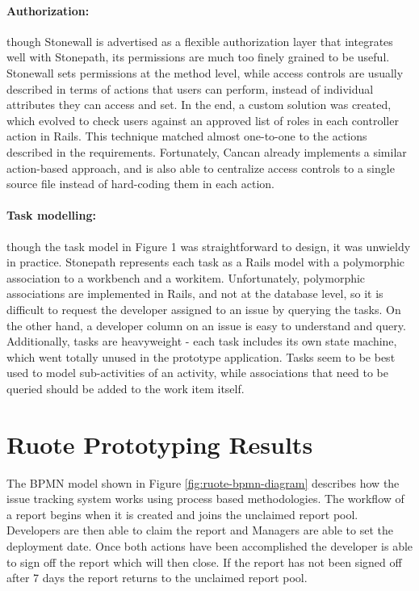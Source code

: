 \documentclass[document.tex]{subfiles}
\begin{document}
\paragraph{Authorization:} though Stonewall is advertised as a flexible authorization layer that integrates well with Stonepath, its permissions are much too finely grained to be useful. Stonewall sets permissions at the method level, while access controls are usually described in terms of actions that users can perform, instead of individual attributes they can access and set. In the end, a custom solution was created, which evolved to check users against an approved list of roles in each controller action in Rails. This technique matched almost one-to-one to the actions described in the requirements. Fortunately, Cancan already implements a similar action-based approach, and is also able to centralize access controls to a single source file instead of hard-coding them in each action.

\paragraph{Task modelling:} though the task model in Figure 1 was straightforward to design, it was unwieldy in practice. Stonepath represents each task as a Rails model with a polymorphic association to a workbench and a workitem. Unfortunately, polymorphic associations are implemented in Rails, and not at the database level, so it is difficult to request the developer assigned to an issue by querying the tasks. On the other hand, a developer column on an issue is easy to understand and query. Additionally, tasks are heavyweight - each task includes its own state machine, which went totally unused in the prototype application. Tasks seem to be best used to model sub-activities of an activity, while associations that need to be queried should be added to the work item itself.


\FloatBarrier

\section {Ruote Prototyping Results}
\label {sec:ruote-prototyping-results}

The BPMN model shown in Figure \ref{fig:ruote-bpmn-diagram} describes how the issue tracking system works using process based methodologies. The workflow of a report begins when it is created and joins the unclaimed report pool. Developers are then able to claim the report and Managers are able to set the deployment date. Once both actions have been accomplished the developer is able to sign off the report which will then close. If the report has not been signed off after 7 days the report returns to the unclaimed report pool.
\end{document}
